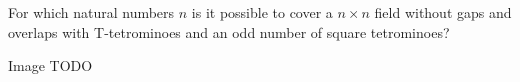 For which natural numbers $n$ is it possible to cover a $n\times n$ field without gaps
and overlaps with T-tetrominoes and an odd number of square tetrominoes?

Image TODO